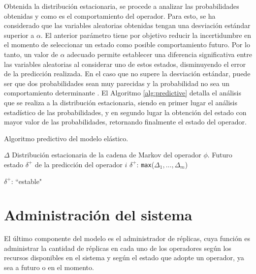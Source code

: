 

Obtenida la distribuci\'on estacionaria, se procede a analizar las probabilidades obtenidas y como es el comportamiento del operador. Para esto, se ha considerado que las variables aleatorias obtenidas tengan una desviaci\'on est\'andar superior a $\alpha$. El anterior par\'ametro tiene por objetivo reducir la incertidumbre en el momento de seleccionar un estado como posible comportamiento futuro. \normalsize{Por lo tanto, un valor de $\alpha$ adecuado permite establecer una diferencia significativa entre las variables aleatorias al considerar uno de estos estados, disminuyendo el error de la predicci\'on realizada.} En el caso que no supere la desviaci\'on est\'andar, puede ser que dos probabilidades sean muy parecidas y la probabilidad no sea un comportamiento determinante \citep{soong2004fundamentals}. El Algoritmo \ref{alg:predictive} detalla el an\'alisis que se realiza a la distribuci\'on estacionaria, siendo en primer lugar el an\'alisis estad\'istico de las probabilidades, y en segundo lugar la obtenci\'on del estado con mayor valor de las probabilidades, retornando finalmente el estado del operador.

\begin{algorithm}[t]
	\caption{Algoritmo predictivo del modelo el\'astico.}
	\label{alg:predictive}
	\begin{algorithmic}[1]
	\REQUIRE$\Delta$ Distribuci\'on estacionaria de la cadena de Markov del operador $\phi$.
	\ENSURE Futuro estado $\delta^{+}$ de la predicci\'on del operador $i$
		\RETURN $\delta^{+}$: \texttt{max}({$\Delta_1,\ldots,\Delta_m$})

	\ELSE
		\RETURN $\delta^{+}$: ``estable"
	\ENDIF
	\end{algorithmic}
\end{algorithm}

\section{Administraci\'on del sistema}

El \'ultimo componente del modelo es el administrador de r\'eplicas, cuya funci\'on es administrar la cantidad de r\'eplicas en cada uno de los operadores seg\'un los recursos disponibles en el sistema y seg\'un el estado que adopte un operador, ya sea a futuro o en el momento.


